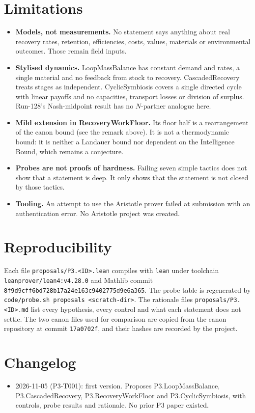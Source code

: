 \documentclass[11pt]{article}
\theoremstyle{remark}
\begin{document}
\section{Limitations}
\begin{itemize}
\item \textbf{Models, not measurements.} No statement says anything about real recovery rates,
retention, efficiencies, costs, values, materials or environmental outcomes. Those remain field
inputs.
\item \textbf{Stylised dynamics.} LoopMassBalance has constant demand and rates, a single
material and no feedback from stock to recovery. CascadedRecovery treats stages as independent.
CyclicSymbiosis covers a single directed cycle with linear payoffs and no capacities, transport
losses or division of surplus. Run-128's Nash-midpoint result has no $N$-partner analogue here.
\item \textbf{Mild extension in RecoveryWorkFloor.} Its floor half is a rearrangement of the
canon bound (see the remark above). It is not a thermodynamic bound: it is neither a Landauer
bound nor dependent on the Intelligence Bound, which remains a conjecture.
\item \textbf{Probes are not proofs of hardness.} Failing seven simple tactics does not show
that a statement is deep. It only shows that the statement is not closed by those tactics.
\item \textbf{Tooling.} An attempt to use the Aristotle prover failed at submission with an
authentication error. No Aristotle project was created.
\end{itemize}

\section{Reproducibility}
Each file \texttt{proposals/P3.<ID>.lean} compiles with \texttt{lean} under toolchain
\texttt{leanprover/lean4:v4.28.0} and Mathlib commit
\texttt{8f9d9cff6bd728b17a24e163c9402775d9e6a365}. The probe table is regenerated by
\texttt{code/probe.sh proposals <scratch-dir>}. The rationale files
\texttt{proposals/P3.<ID>.md} list every hypothesis, every control and what each statement does
not settle. The two canon files used for comparison are copied from the canon repository at
commit \texttt{17a0702f}, and their hashes are recorded by the project.

\section{Changelog}
\begin{itemize}
\item 2026-11-05 (P3-T001): first version. Proposes P3.LoopMassBalance, P3.CascadedRecovery,
P3.RecoveryWorkFloor and P3.CyclicSymbiosis, with controls, probe results and rationale. No prior
P3 paper existed.
\end{itemize}



\end{document}
